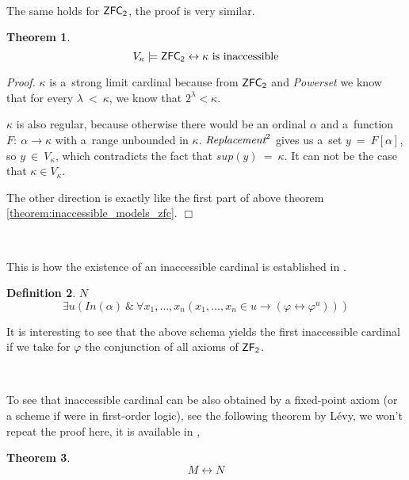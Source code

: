 \documentclass[12pt,a4paper]{article}
\newtheorem{theorem}{Theorem}[section]
\newtheorem{definition}[theorem]{Definition}
\newenvironment{proof}
{\noindent \textit{Proof.}}
{\hspace*{\fill} $\Box$}
\renewcommand{\iff}{\leftrightarrow}
\newcommand{\then}{\rightarrow}
\begin{document}
\

The same holds for $\sf{ZFC}_2$, the proof is very similar.
\begin{theorem}\label{theorem:inaccessible_models_zfc_2}
\begin{equation}
V_\kappa \models \sf{ZFC}_2 \iff \mbox{$\kappa$ is inaccessible}
\end{equation}
\end{theorem}
\begin{proof}
$\kappa$ is a~strong limit cardinal because from $\sf{ZFC}_2$ and \emph{Powerset} we know that for every $\lambda\ <\ \kappa$, we know that $2^{\lambda} < \kappa$.

$\kappa$ is also regular, because otherwise there would be an ordinal $\alpha$ and a~function $F:\ \alpha \then \kappa$ with a~range unbounded in $\kappa$. 
$\emph{Replacement}^2$ gives us a~set $y\ =\ F[\alpha]$, so $y\ \in\ V_\kappa$, which contradicts the fact that $sup(y)\ =\ \kappa$. It can not be the case that $\kappa \in V_\kappa$.
\

The other direction is exactly like the first part of above theorem \ref{theorem:inaccessible_models_zfc}.
\end{proof}

\

This is how the existence of an inaccessible cardinal is established in \cite{Levy60a}. 
\begin{definition}{$N$}\\
\begin{equation}
\exists u (In(\alpha)\ \&\ \forall x_1, \ldots, x_n (x_1, \ldots, x_n \in u \then (\varphi \iff \varphi^u)))
\end{equation}
\end{definition}
It is interesting to see that the above schema yields the first inaccessible cardinal if we take for $\varphi$ the conjunction of all axioms of $\sf{ZF_2}$.

\

To see that inaccessible cardinal can be also obtained by a fixed-point axiom (or a scheme if were in first-order logic), see the following theorem by Lévy, we won't repeat the proof here, it is available in \cite[Theorem 3]{Levy60a}, 
\begin{theorem}\label{theorem:levy_m_iff_n}
\begin{equation}
M \iff N
\end{equation}
\end{theorem}
\end{document}
